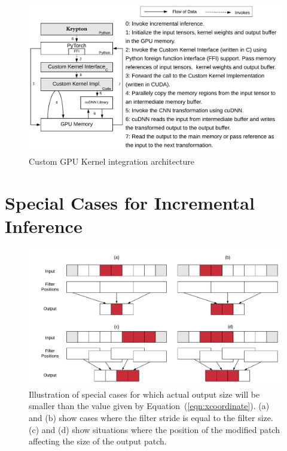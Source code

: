 \begin{figure}[t]
\includegraphics[width=\columnwidth]{images/gpu_kernel_impl.pdf}
\vspace{-6mm}
\caption{Custom GPU Kernel integration architecture}
\label{fig:custom_kernel_integration}
\end{figure}


\section{Special Cases for Incremental Inference}

\begin{figure}[t]
\includegraphics[width=\columnwidth]{images/less_one_example}
\vspace{-6mm}
\caption{Illustration of special cases for which actual output size will be smaller than the value given by Equation~(\ref{eqn:xcoordinate}). (a) and (b) show cases where the filter stride is equal to the filter size. (c) and (d) show situations where the position of the modified patch affecting the size of the output patch.}
\vspace{-4mm}
\label{fig:less_one_example}
\end{figure}

